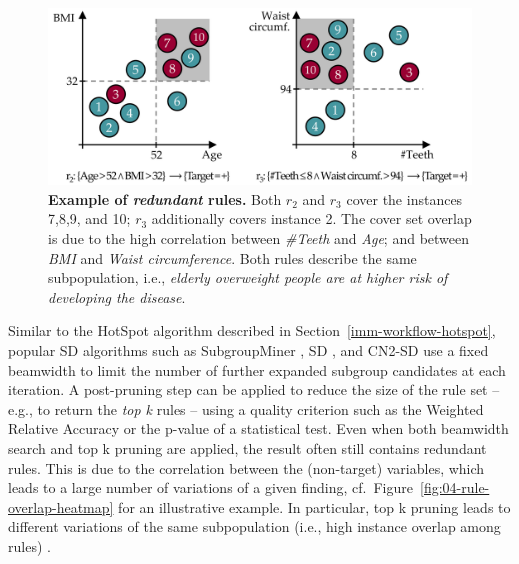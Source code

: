 \documentclass[
  oneside]{book}
\begin{document}
\begin{figure}[htb]

{\centering \includegraphics[width=1\linewidth]{figures/04-rule-redundancy} 

}

\caption{\textbf{Example of \emph{redundant} rules.} Both \(r_2\) and \(r_3\) cover the instances 7,8,9, and 10; \(r_3\) additionally covers instance 2. The cover set overlap is due to the high correlation between \emph{\#Teeth} and \emph{Age}; and between \emph{BMI} and \emph{Waist circumference}. Both rules describe the same subpopulation, i.e., \emph{elderly overweight people are at higher risk of developing the disease}.}\label{fig:04-rule-redundancy}
\end{figure}

Similar to the HotSpot algorithm described in Section~\ref{imm-workflow-hotspot}, popular SD algorithms such as SubgroupMiner \autocite{Kloesgen:SubgroupMiner2002},
SD \autocite{Gamberger:SD02}, and CN2-SD \autocite{Lavravc:CN2-SD04} use a fixed beamwidth \autocite{Fuernkranz:12} to limit the number of further expanded subgroup candidates at each iteration.
A post-pruning step can be applied to reduce the size of the rule set -- e.g., to return the \emph{top k} rules -- using a quality criterion such as the Weighted Relative Accuracy \autocite{lavravc1999rule} or the p-value of a statistical test.
Even when both beamwidth search and top k pruning are applied, the result often still contains redundant rules.
This is due to the correlation between the (non-target) variables, which leads to a large number of variations of a given finding, cf.~Figure~\ref{fig:04-rule-overlap-heatmap} for an illustrative example.
In particular, top k pruning leads to different variations of the same subpopulation (i.e., high instance overlap among rules) \autocite{VanLeeuwen:DSSD12}.
\end{document}
